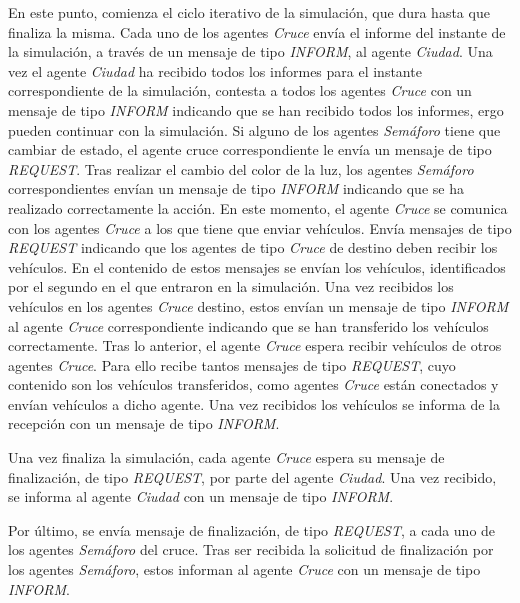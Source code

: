 En este punto, comienza el ciclo iterativo de la simulación, que dura hasta que finaliza la misma. 
\newline Cada uno de los agentes \textit{Cruce} envía el informe del instante de la simulación, a través de un mensaje de tipo \textit{INFORM}, al agente \textit{Ciudad}. Una vez el agente \textit{Ciudad} ha recibido todos los informes para el instante correspondiente de la simulación, contesta a todos los agentes \textit{Cruce} con un mensaje de tipo \textit{INFORM} indicando que se han recibido todos los informes, ergo pueden continuar con la simulación.
\newline Si alguno de los agentes \textit{Semáforo} tiene que cambiar de estado, el agente cruce correspondiente le envía un mensaje de tipo \textit{REQUEST}. Tras realizar el cambio del color de la luz, los agentes \textit{Semáforo} correspondientes envían un mensaje de tipo \textit{INFORM} indicando que se ha realizado correctamente la acción.
\newline En este momento, el agente \textit{Cruce} se comunica con los agentes \textit{Cruce} a los que tiene que enviar vehículos. Envía mensajes de tipo \textit{REQUEST} indicando que los agentes de tipo \textit{Cruce} de destino deben recibir los vehículos. En el contenido de estos mensajes se envían los vehículos, identificados por el segundo en el que entraron en la simulación. Una vez recibidos los vehículos en los agentes \textit{Cruce} destino, estos envían un mensaje de tipo \textit{INFORM} al agente \textit{Cruce} correspondiente indicando que se han transferido los vehículos correctamente.
\newline Tras lo anterior, el agente \textit{Cruce} espera recibir vehículos de otros agentes \textit{Cruce}. Para ello recibe tantos mensajes de tipo \textit{REQUEST}, cuyo contenido son los vehículos transferidos, como agentes \textit{Cruce} están conectados y envían vehículos a dicho agente. Una vez recibidos los vehículos se informa de la recepción con un mensaje de tipo \textit{INFORM}.

Una vez finaliza la simulación, cada agente \textit{Cruce} espera su mensaje de finalización, de tipo \textit{REQUEST}, por parte del agente \textit{Ciudad}. Una vez recibido, se informa al agente \textit{Ciudad} con un mensaje de tipo \textit{INFORM}.

Por último, se envía mensaje de finalización, de tipo \textit{REQUEST}, a cada uno de los agentes \textit{Semáforo} del cruce. Tras ser recibida la solicitud de finalización por los agentes \textit{Semáforo}, estos informan al agente \textit{Cruce} con un mensaje de tipo \textit{INFORM}. 


